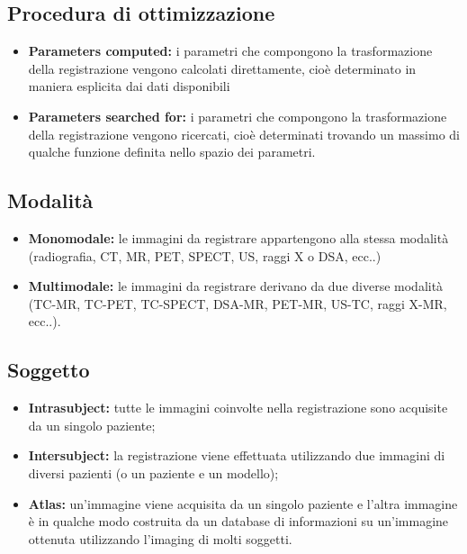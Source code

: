\subsection{Procedura di ottimizzazione}
\begin{itemize}
    \item \textbf{Parameters computed:} i parametri che compongono la trasformazione della registrazione vengono calcolati direttamente, cioè determinato in maniera esplicita dai dati
          disponibili
    \item \textbf{Parameters searched for:} i parametri che compongono la trasformazione della registrazione vengono ricercati, cioè
          determinati trovando un massimo di qualche funzione definita nello spazio dei parametri.
\end{itemize}

\subsection{Modalità}
\begin{itemize}
    \item \textbf{Monomodale: }le immagini da registrare appartengono alla
          stessa modalità (radiografia, CT, MR, PET, SPECT, US,
          raggi X o DSA, ecc..)
    \item \textbf{Multimodale: }le immagini da registrare derivano da due
          diverse modalità (TC-MR, TC-PET, TC-SPECT, DSA-MR,
          PET-MR, US-TC, raggi X-MR, ecc..).
\end{itemize}

\subsection{Soggetto}
\begin{itemize}
    \item \textbf{Intrasubject: }tutte le immagini coinvolte nella registrazione
          sono acquisite da un singolo paziente;
    \item \textbf{Intersubject: }la registrazione viene effettuata utilizzando due
          immagini di diversi pazienti (o un paziente e un modello);
    \item \textbf{Atlas:} un'immagine viene acquisita da un singolo paziente e
          l'altra immagine è in qualche modo costruita da un database
          di informazioni su un'immagine ottenuta utilizzando l'imaging
          di molti soggetti.
\end{itemize}

